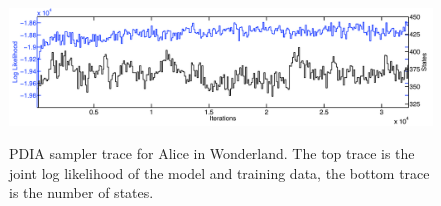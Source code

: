 \begin{figure}[htbp]
\centering
\includegraphics[width=1\textwidth]{results/aiw_sampler_trace}
\label{fig:aiw_sampler_trace}
\caption{PDIA sampler trace for Alice in Wonderland.  The top trace is the joint log likelihood of the model and training data, the bottom trace is the number of states.}
\end{figure}














